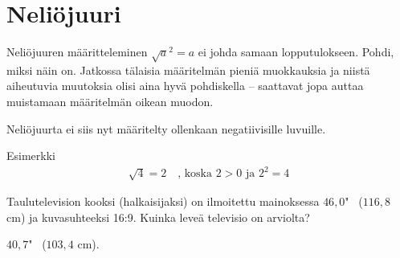 \section{Neliöjuuri}


Neliöjuuren määritteleminen $\sqrt{a}^2=a$ ei johda samaan lopputulokseen. Pohdi, miksi näin on.
Jatkossa tälaisia määritelmän pieniä muokkauksia ja niistä aiheutuvia muutoksia olisi aina hyvä pohdiskella -- saattavat jopa auttaa muistamaan määritelmän oikean muodon.


Neliöjuurta ei siis nyt määritelty ollenkaan negatiivisille luvuille.


Esimerkki
\begin{align*}
\sqrt{4} = 2 \quad \textrm{, koska $2>0$ ja $2^2 =4$} 
\end{align*}


\begin{tehtava}
Taulutelevision kooksi (halkaisijaksi) on ilmoitettu mainoksessa $46,0$" \, ($116,8$ cm) ja kuvasuhteeksi 16:9. Kuinka leveä televisio on arviolta?
\begin{vastaus}
$40,7$" \, ($103,4$ cm).
\end{vastaus}
\end{tehtava}


